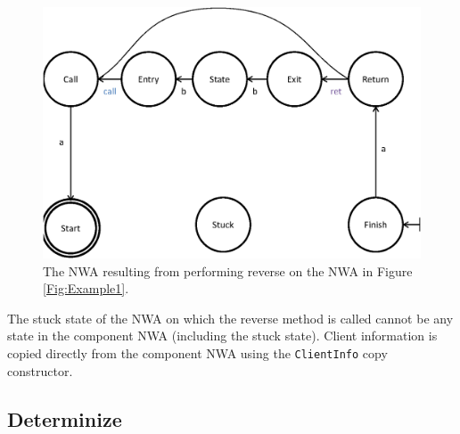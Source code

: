 \documentclass{llncs}
\begin{document}
\begin{figure}[htbp]
  \centering
    \includegraphics[width=12cm]{Figures/Figure15.eps}
  \caption{The NWA resulting from performing reverse on the NWA in Figure \ref{Fig:Example1}.}
  \label{Fig:Reverse1}
\end{figure}

The stuck state of the NWA on which the reverse method is called cannot be any state in the component NWA (including the stuck state).  Client information is copied directly from the component NWA using the \texttt{ClientInfo} copy constructor.

\subsection{Determinize}
\label{Se:Determinize}
\end{document}
